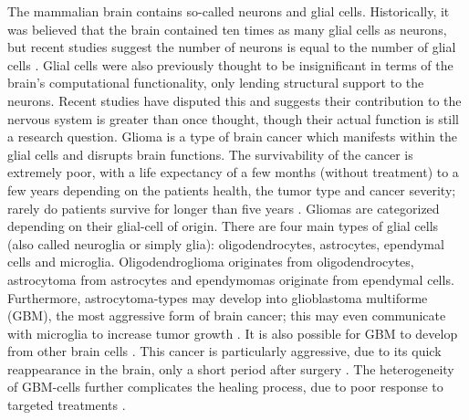 The mammalian brain contains so-called neurons and glial cells. Historically, it was believed that the brain contained ten times as many glial cells as neurons, but recent studies suggest the number of neurons is equal to the number of glial cells \cite{von2016search}. Glial cells were also previously thought to be insignificant in terms of the brain's computational functionality, only lending structural support to the neurons. Recent studies have disputed this and suggests their contribution to the nervous system is greater than once thought, though their actual function is still a research question. Glioma is a type of brain cancer which manifests within the glial cells and disrupts brain functions. The survivability of the cancer is extremely poor, with a life expectancy of a few months (without treatment) to a few years depending on the patients health, the tumor type and cancer severity; rarely do patients survive for longer than five years \cite{glialcells, gallego2015nonsurgical, bleeker2012recent}. Gliomas are categorized depending on their glial-cell of origin. There are four main types of glial cells (also called neuroglia or simply glia): oligodendrocytes, astrocytes, ependymal cells and microglia. Oligodendroglioma originates from oligodendrocytes, astrocytoma from astrocytes and ependymomas originate from ependymal cells. Furthermore, astrocytoma-types may develop into glioblastoma multiforme (GBM), the most aggressive form of brain cancer; this may even communicate with  microglia to increase tumor growth \cite{maas2020glioblastoma}. It is also possible for GBM to develop from other brain cells \cite{glialcells}. This cancer is particularly aggressive, due to its quick reappearance in the brain, only a short period after surgery \cite{gallego2015nonsurgical}. The heterogeneity of GBM-cells further complicates the healing process, due to poor response to targeted treatments \cite{dirkse2019stem}.

